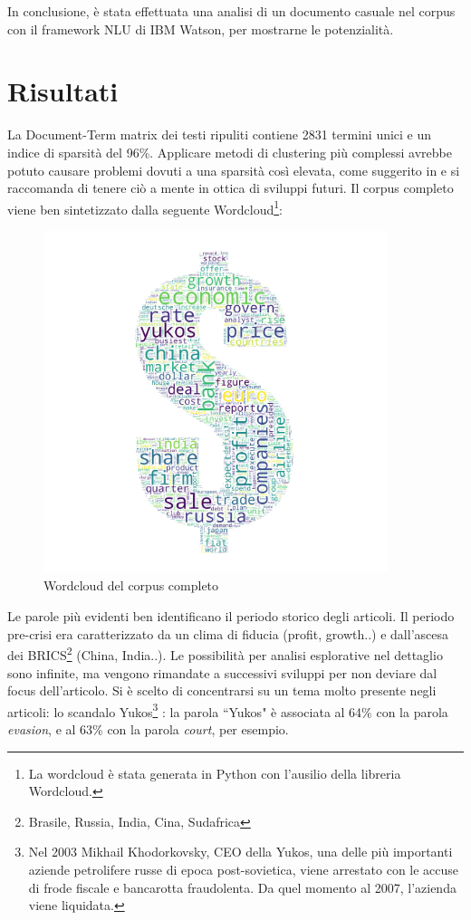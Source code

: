 \documentclass[]{article}
\begin{document}
In conclusione, è stata effettuata una analisi di un documento casuale nel corpus con il framework NLU di IBM Watson, per mostrarne le potenzialità.
\section{Risultati}
La Document-Term matrix dei testi ripuliti contiene 2831 termini unici e un indice di sparsità del 96\%. Applicare metodi di clustering più complessi avrebbe potuto causare problemi dovuti a una sparsità così elevata, come suggerito in \cite{GreeneOriginal} e si raccomanda di tenere ciò a mente in ottica di sviluppi futuri.
Il corpus completo viene ben sintetizzato dalla seguente Wordcloud\footnote{La wordcloud è stata generata in Python con l'ausilio della libreria Wordcloud.}:

\begin{figure}[H]
	\includegraphics[width=\linewidth, height=10cm]{../graphs/dollarcloud.png}
	\caption{Wordcloud del corpus completo}
\end{figure}

Le parole più evidenti ben identificano il periodo storico degli articoli. Il periodo pre-crisi era caratterizzato da un clima di fiducia (profit, growth..) e dall'ascesa dei BRICS\footnote{Brasile, Russia, India, Cina, Sudafrica} (China, India..).
Le possibilità per analisi esplorative nel dettaglio sono infinite, ma vengono rimandate a successivi sviluppi per non deviare dal focus dell'articolo.
\newline
Si è scelto di concentrarsi su un tema molto presente negli articoli: lo scandalo Yukos\footnote{Nel 2003 Mikhail Khodorkovsky, CEO della Yukos, una delle più importanti aziende petrolifere russe di epoca post-sovietica, viene arrestato con le accuse di frode fiscale e bancarotta fraudolenta. Da quel momento al 2007, l'azienda viene liquidata.} \cite{Yukos}: la parola ``Yukos" è associata al 64\% con la parola \textit{evasion}, e al 63\% con la parola \textit{court}, per esempio.
\end{document}
